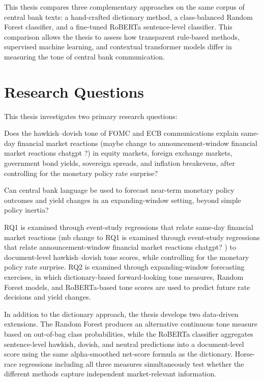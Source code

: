 This thesis compares three complementary approaches on the same
corpus of central bank texts: a hand-crafted dictionary method, a
class-balanced Random Forest classifier, and a fine-tuned RoBERTa
sentence-level classifier. This comparison allows the thesis to
assess how transparent rule-based methods, supervised machine
learning, and contextual transformer models differ in measuring the
tone of central bank communication.

\section{Research Questions}
\label{sec:intro_rqs}

This thesis investigates two primary research questions:

\begin{description}[leftmargin=1.5cm, style=nextline]
  \item[RQ1] Does the hawkish--dovish tone of FOMC and ECB
    communications explain same-day financial market reactions (maybe change to announcement-window financial market reactions chatgpt ?) in
    equity markets, foreign exchange markets, government bond yields,
    sovereign spreads, and inflation breakevens, after controlling for
    the monetary policy rate surprise?

  \item[RQ2] Can central bank language be used to forecast near-term
    monetary policy outcomes and yield changes in an expanding-window
    setting, beyond simple policy inertia?
\end{description}

RQ1 is examined through event-study regressions that relate same-day
financial market reactions (mb change to RQ1 is examined through event-study regressions that relate
announcement-window financial market reactions chatgpt? ) to document-level hawkish--dovish tone
scores, while controlling for the monetary policy rate surprise. RQ2 is
examined through expanding-window forecasting exercises, in which
dictionary-based forward-looking tone measures, Random Forest models,
and RoBERTa-based tone scores are used to predict future rate decisions
and yield changes.

In addition to the dictionary approach, the thesis develops two
data-driven extensions. The Random Forest produces an alternative
continuous tone measure based on out-of-bag class probabilities, while
the RoBERTa classifier aggregates sentence-level hawkish, dovish, and
neutral predictions into a document-level score using the same
alpha-smoothed net-score formula as the dictionary. Horse-race
regressions including all three measures simultaneously test whether
the different methods capture independent market-relevant information.

